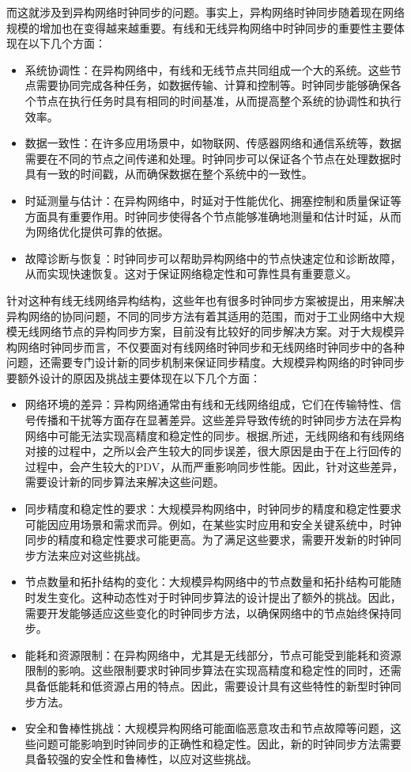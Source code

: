 \documentclass[UTF8,a4paper,12pt]{ctexart}
\numberwithin{equation}{section}
\begin{document}
	而这就涉及到异构网络时钟同步的问题。事实上，异构网络时钟同步随着现在网络规模的增加也在变得越来越重要。有线和无线异构网络中时钟同步的重要性主要体现在以下几个方面：
	\begin{itemize}
		\item 系统协调性：在异构网络中，有线和无线节点共同组成一个大的系统。这些节点需要协同完成各种任务，如数据传输、计算和控制等。时钟同步能够确保各个节点在执行任务时具有相同的时间基准，从而提高整个系统的协调性和执行效率。
		\item 数据一致性：在许多应用场景中，如物联网、传感器网络和通信系统等，数据需要在不同的节点之间传递和处理。时钟同步可以保证各个节点在处理数据时具有一致的时间戳，从而确保数据在整个系统中的一致性。
		\item 时延测量与估计：在异构网络中，时延对于性能优化、拥塞控制和质量保证等方面具有重要作用。时钟同步使得各个节点能够准确地测量和估计时延，从而为网络优化提供可靠的依据。
		\item 故障诊断与恢复：时钟同步可以帮助异构网络中的节点快速定位和诊断故障，从而实现快速恢复。这对于保证网络稳定性和可靠性具有重要意义。
	\end{itemize}
	
	针对这种有线无线网络异构结构，这些年也有很多时钟同步方案被提出，用来解决异构网络的协同问题，不同的同步方法有着其适用的范围，而对于工业网络中大规模无线网络节点的异构同步方案，目前没有比较好的同步解决方案。对于大规模异构网络时钟同步而言，不仅要面对有线网络时钟同步和无线网络时钟同步中的各种问题，还需要专门设计新的同步机制来保证同步精度。大规模异构网络的时钟同步要额外设计的原因及挑战主要体现在以下几个方面：
	\begin{itemize}
		\item 网络环境的差异：异构网络通常由有线和无线网络组成，它们在传输特性、信号传播和干扰等方面存在显著差异。这些差异导致传统的时钟同步方法在异构网络中可能无法实现高精度和稳定性的同步。根据\cite{chaloupka2014clock},\cite{johannessen2004time}所述，无线网络和有线网络对接的过程中，之所以会产生较大的同步误差，很大原因是由于在上行回传的过程中，会产生较大的PDV，从而严重影响同步性能。因此，针对这些差异，需要设计新的同步算法来解决这些问题。
		\item 同步精度和稳定性的要求：大规模异构网络中，时钟同步的精度和稳定性要求可能因应用场景和需求而异。例如，在某些实时应用和安全关键系统中，时钟同步的精度和稳定性要求可能更高。为了满足这些要求，需要开发新的时钟同步方法来应对这些挑战。
		\item 节点数量和拓扑结构的变化：大规模异构网络中的节点数量和拓扑结构可能随时发生变化。这种动态性对于时钟同步算法的设计提出了额外的挑战。因此，需要开发能够适应这些变化的时钟同步方法，以确保网络中的节点始终保持同步。
		\item 能耗和资源限制：在异构网络中，尤其是无线部分，节点可能受到能耗和资源限制的影响。这些限制要求时钟同步算法在实现高精度和稳定性的同时，还需具备低能耗和低资源占用的特点。因此，需要设计具有这些特性的新型时钟同步方法。
		\item 安全和鲁棒性挑战：大规模异构网络可能面临恶意攻击和节点故障等问题，这些问题可能影响到时钟同步的正确性和稳定性。因此，新的时钟同步方法需要具备较强的安全性和鲁棒性，以应对这些挑战。
	\end{itemize}
	
\end{document}
